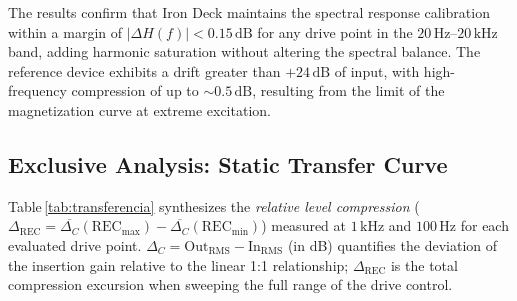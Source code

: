 \documentclass[10pt,conference]{IEEEtran}
\begin{document}
The results confirm that Iron Deck maintains the spectral response calibration within a margin
of $|\Delta H(f)| < 0.15\,\text{dB}$ for any drive point in the $20\,\text{Hz}$–$20\,\text{kHz}$ band,
adding harmonic saturation without altering the spectral balance. The reference device exhibits
a drift greater than $+24\,\text{dB}$ of input, with high-frequency compression of up to
$\sim$$0.5\,\text{dB}$, resulting from the limit of the magnetization curve at extreme excitation.

\subsection{Exclusive Analysis: Static Transfer Curve}
\label{sec:transferencia}

Table\,\ref{tab:transferencia} synthesizes the \emph{relative level compression}
($\Delta_{\text{REC}} = \overline{\Delta_C}(\text{REC}_{\text{max}}) -
\overline{\Delta_C}(\text{REC}_{\text{min}})$) measured at $1\,\text{kHz}$ and $100\,\text{Hz}$
for each evaluated drive point. $\Delta_C = \text{Out}_{\text{RMS}} -
\text{In}_{\text{RMS}}$ (in dB) quantifies the deviation of the insertion gain relative
to the linear 1:1 relationship; $\Delta_{\text{REC}}$ is the total compression excursion
when sweeping the full range of the drive control.
\end{document}
